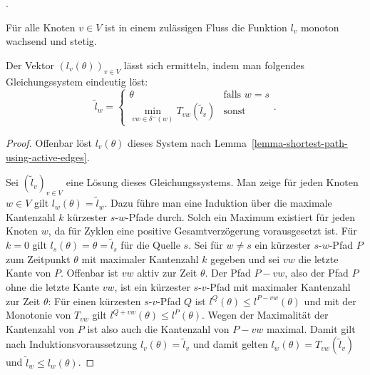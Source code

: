 .

\begin{lemma}
	Für alle Knoten $v\in V$ ist in einem zulässigen Fluss die Funktion $l_v$ monoton wachsend und stetig.
\end{lemma}

\begin{proposition}
	Der Vektor $(l_v(\theta))_{v\in V}$ lässt sich ermitteln, indem man folgendes Gleichungssystem eindeutig löst:
	$$ \tilde{l}_w = \begin{cases}
	\theta & \text{falls } w=s \\
	\min\limits_{vw\in \delta^-(w)} T_{vw}(\tilde{l}_v) & \text{sonst}
	\end{cases}.$$
\end{proposition}
\begin{proof}
	Offenbar löst $l_v(\theta)$ dieses System nach Lemma~\ref{lemma-shortest-path-using-active-edges}.
	
	Sei $(\tilde{l}_v)_{v\in V}$ eine Lösung dieses Gleichungssystems.
	Man zeige für jeden Knoten $w\in V$ gilt $l_w(\theta) = \tilde{l}_w$.
	Dazu führe man eine Induktion über die maximale Kantenzahl $k$ kürzester $s$-$w$-Pfade durch.
	Solch ein Maximum existiert für jeden Knoten $w$, da für Zyklen eine positive Gesamtverzögerung vorausgesetzt ist.
	Für $k=0$ gilt $l_s(\theta)=\theta = \tilde{l}_s$ für die Quelle $s$.
	Sei für $w\neq s$ ein kürzester $s$-$w$-Pfad $P$ zum Zeitpunkt $\theta$ mit maximaler Kantenzahl $k$ gegeben und sei $vw$ die letzte Kante von $P$.
	Offenbar ist $vw$ aktiv zur Zeit $\theta$.
	Der Pfad $P-vw$, also der Pfad $P$ ohne die letzte Kante $vw$, ist ein kürzester $s$-$v$-Pfad mit maximaler Kantenzahl zur Zeit $\theta$:
	Für einen kürzesten $s$-$v$-Pfad $Q$ ist $l^Q(\theta)\leq l^{P-vw}(\theta)$ und mit der Monotonie von $T_{vw}$ gilt $l^{Q+vw}(\theta)\leq l^P(\theta)$.
	Wegen der Maximalität der Kantenzahl von $P$ ist also auch die Kantenzahl von $P-vw$ maximal.
	Damit gilt nach Induktionsvoraussetzung $l_v(\theta) = \tilde{l}_v$
	und damit gelten $l_w(\theta) = T_{vw}(\tilde{l}_v)$ und $\tilde{l}_w \leq l_w(\theta)$.
\end{proof}
